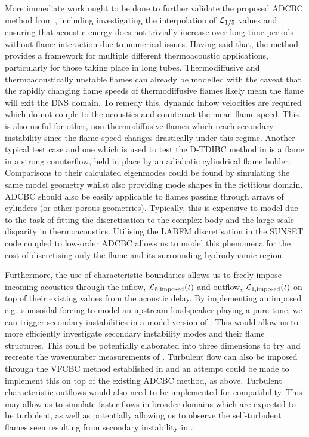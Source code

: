 More immediate work ought to be done to further validate the proposed ADCBC method from , including investigating the interpolation of $\mathcal{L}_{1/5}$ values and ensuring that acoustic energy does not trivially increase over long time periods without flame interaction due to numerical issues. Having said that, the method provides a framework for multiple different thermoacoustic applications, particularly for those taking place in long tubes. Thermodiffusive and thermoacoustically unstable flames can already be modelled with the caveat that the rapidly changing flame speeds of thermodiffusive flames likely mean the flame will exit the DNS domain. To remedy this, dynamic inflow velocities are required which do not couple to the acoustics and counteract the mean flame speed. This is also useful for other, non-thermodiffusive flames which reach secondary instability since the flame speed changes drastically under this regime. Another typical test case and one which is used to test the D-TDIBC method in \cite{douasbin2018DelayedtimeDomainImpedance} is a flame in a strong counterflow, held in place by an adiabatic cylindrical flame holder. Comparisons to their calculated eigenmodes could be found by simulating the same model geometry whilst also providing mode shapes in the fictitious domain. ADCBC should also be easily applicable to flames passing through arrays of cylinders (or other porous geometries). Typically, this is expensive to model due to the task of fitting the discretisation to the complex body and the large scale disparity in thermoacoustics. Utilising the LABFM discretisation in the SUNSET code coupled to low-order ADCBC allows us to model this phenomena for the cost of discretising only the flame and its surrounding hydrodynamic region.

Furthermore, the use of characteristic boundaries allows us to freely impose incoming acoustics through the inflow, $\mathcal{L}_{5, \mathrm{imposed}}(t)$ and outflow, $\mathcal{L}_{1, \mathrm{imposed}}(t)$ on top of their existing values from the acoustic delay. By implementing an imposed e.g.\ sinusoidal forcing to model an upstream loudspeaker playing a pure tone, we can trigger secondary instabilities in a model version of \cite{searby1991ParametricAcousticInstability}. This would allow us to more efficiently investigate secondary instability modes and their flame structures. This could be potentially elaborated into three dimensions to try and recreate the wavenumber measurements of \cite{delfin2024DeterminationMethodMarkstein}. Turbulent flow can also be imposed through the VFCBC method established in \cite{guezennec2009AcousticallyNonreflectingReflecting} and an attempt could be made to implement this on top of the existing ADCBC method, as above. Turbulent characteristic outflows would also need to be implemented for compatibility. This may allow us to simulate faster flows in broader domains which are expected to be turbulent, as well as potentially allowing us to observe the self-turbulent flames seen resulting from secondary instability in \cite{searby1992AcousticInstabilityPremixed}.


